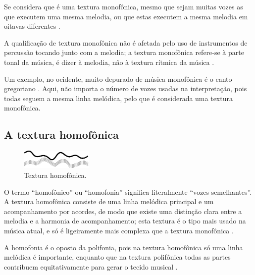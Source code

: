 Se considera que é uma textura monofônica, mesmo que sejam muitas vozes as que executem uma mesma melodia, 
ou que estas executem a mesma melodia em oitavas diferentes \cite[pp. 42]{bennett1993elementos} \cite[pp. 58]{holland2013music}.

A qualificação de textura  monofônica não é afetada pelo uso de instrumentos de percussão tocando junto com a melodia;
a textura monofônica refere-se à parte tonal da música, é dizer à melodia, 
não à textura rítmica da música \cite[pp. 58]{holland2013music}.

\begin{example}
Um exemplo, no ocidente,  muito depurado de música monofônica é o canto gregoriano
\cite[pp. 77]{copland1974ouvir} \cite[pp. 29]{kerman2015listen} \cite[pp. 58]{holland2013music}. 
Aqui, não importa o número de vozes usadas na interpretação,
pois todas seguem a mesma linha melódica, pelo que é considerada uma textura monofônica.
\end{example}


 

\subsection{A textura homofônica}
\label{subsec:homofonica}
\begin{figure}
  \centering
    \includegraphics[width=0.31\textwidth]{chapters/cap-musicalidade-percepcion/honofonica1.eps}
  \caption{Textura homofônica.}
\end{figure}
O termo ``homofônico'' ou ``homofonia'' significa literalmente ``vozes semelhantes''.%
A textura homofônica consiste de uma linha melódica principal e um acompanhamento por acordes,
de modo que existe uma distinção clara entre a melodia e a harmonia de acompanhamento;
esta textura é o tipo  mais usado na música atual,
e só é ligeiramente mais complexa que a textura monofônica 
\cite[pp. 78]{copland1974ouvir} \cite[pp. 29]{kerman2015listen} 
\cite[pp. 43]{bennett1993elementos} \cite[pp. 58]{holland2013music}.


A homofonia é o oposto da polifonia, 
pois na textura homofônica só uma linha melódica é importante,
enquanto que na textura polifônica todas as partes contribuem equitativamente para gerar o tecido musical
\cite[pp. 687]{apel1969harvard}.

